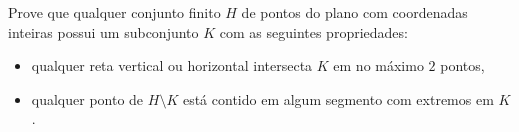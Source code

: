 Prove que qualquer conjunto finito $H$ de pontos do plano com coordenadas inteiras possui um subconjunto $K$ com as seguintes propriedades:
\begin{itemize}
	\item qualquer reta vertical ou horizontal intersecta $K$ em no máximo $2$ pontos,
	\item qualquer ponto de $H\setminus K$ está contido em algum segmento com extremos em $K$.
\end{itemize}
